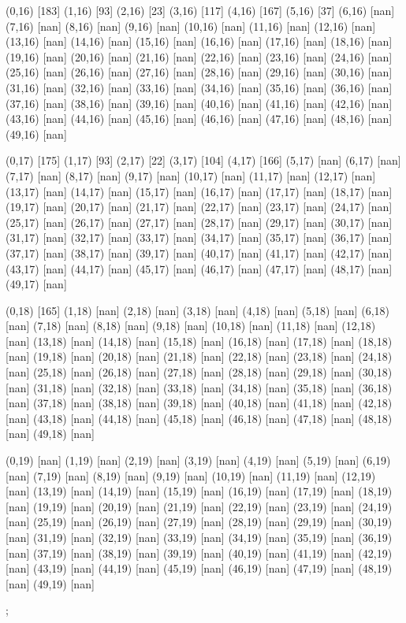 {(0,16) [183] (1,16) [93] (2,16) [23] (3,16) [117] (4,16) [167] (5,16) [37] (6,16) [nan] (7,16) [nan] (8,16) [nan] (9,16) [nan] (10,16) [nan] (11,16) [nan] (12,16) [nan] (13,16) [nan] (14,16) [nan] (15,16) [nan] (16,16) [nan] (17,16) [nan] (18,16) [nan] (19,16) [nan] (20,16) [nan] (21,16) [nan] (22,16) [nan] (23,16) [nan] (24,16) [nan] (25,16) [nan] (26,16) [nan] (27,16) [nan] (28,16) [nan] (29,16) [nan] (30,16) [nan] (31,16) [nan] (32,16) [nan] (33,16) [nan] (34,16) [nan] (35,16) [nan] (36,16) [nan] (37,16) [nan] (38,16) [nan] (39,16) [nan] (40,16) [nan] (41,16) [nan] (42,16) [nan] (43,16) [nan] (44,16) [nan] (45,16) [nan] (46,16) [nan] (47,16) [nan] (48,16) [nan] (49,16) [nan] 

(0,17) [175] (1,17) [93] (2,17) [22] (3,17) [104] (4,17) [166] (5,17) [nan] (6,17) [nan] (7,17) [nan] (8,17) [nan] (9,17) [nan] (10,17) [nan] (11,17) [nan] (12,17) [nan] (13,17) [nan] (14,17) [nan] (15,17) [nan] (16,17) [nan] (17,17) [nan] (18,17) [nan] (19,17) [nan] (20,17) [nan] (21,17) [nan] (22,17) [nan] (23,17) [nan] (24,17) [nan] (25,17) [nan] (26,17) [nan] (27,17) [nan] (28,17) [nan] (29,17) [nan] (30,17) [nan] (31,17) [nan] (32,17) [nan] (33,17) [nan] (34,17) [nan] (35,17) [nan] (36,17) [nan] (37,17) [nan] (38,17) [nan] (39,17) [nan] (40,17) [nan] (41,17) [nan] (42,17) [nan] (43,17) [nan] (44,17) [nan] (45,17) [nan] (46,17) [nan] (47,17) [nan] (48,17) [nan] (49,17) [nan] 

(0,18) [165] (1,18) [nan] (2,18) [nan] (3,18) [nan] (4,18) [nan] (5,18) [nan] (6,18) [nan] (7,18) [nan] (8,18) [nan] (9,18) [nan] (10,18) [nan] (11,18) [nan] (12,18) [nan] (13,18) [nan] (14,18) [nan] (15,18) [nan] (16,18) [nan] (17,18) [nan] (18,18) [nan] (19,18) [nan] (20,18) [nan] (21,18) [nan] (22,18) [nan] (23,18) [nan] (24,18) [nan] (25,18) [nan] (26,18) [nan] (27,18) [nan] (28,18) [nan] (29,18) [nan] (30,18) [nan] (31,18) [nan] (32,18) [nan] (33,18) [nan] (34,18) [nan] (35,18) [nan] (36,18) [nan] (37,18) [nan] (38,18) [nan] (39,18) [nan] (40,18) [nan] (41,18) [nan] (42,18) [nan] (43,18) [nan] (44,18) [nan] (45,18) [nan] (46,18) [nan] (47,18) [nan] (48,18) [nan] (49,18) [nan] 

(0,19) [nan] (1,19) [nan] (2,19) [nan] (3,19) [nan] (4,19) [nan] (5,19) [nan] (6,19) [nan] (7,19) [nan] (8,19) [nan] (9,19) [nan] (10,19) [nan] (11,19) [nan] (12,19) [nan] (13,19) [nan] (14,19) [nan] (15,19) [nan] (16,19) [nan] (17,19) [nan] (18,19) [nan] (19,19) [nan] (20,19) [nan] (21,19) [nan] (22,19) [nan] (23,19) [nan] (24,19) [nan] (25,19) [nan] (26,19) [nan] (27,19) [nan] (28,19) [nan] (29,19) [nan] (30,19) [nan] (31,19) [nan] (32,19) [nan] (33,19) [nan] (34,19) [nan] (35,19) [nan] (36,19) [nan] (37,19) [nan] (38,19) [nan] (39,19) [nan] (40,19) [nan] (41,19) [nan] (42,19) [nan] (43,19) [nan] (44,19) [nan] (45,19) [nan] (46,19) [nan] (47,19) [nan] (48,19) [nan] (49,19) [nan] 

};
